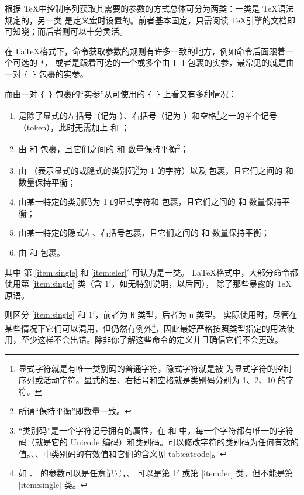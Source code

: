 \documentclass[openany]{book}
\begin{document}
根据 \TeX 中控制序列获取其需要的参数的方式总体可分为两类：一类是 \TeX 语法规定的，另一类
是定义宏时设置的。前者基本固定，只需阅读 \TeX 引擎的文档即可知晓；而后者则可以十分灵活。

在 \LaTeX 格式下，命令获取参数的规则有许多一致的地方，例如命令后面跟着一个可选的 \verb|*|，
或者是跟着可选的一个或多个由 \verb|[ ]| 包裹的实参，最常见的就是由一对 \verb|{ }| 包裹的实参。

而由一对 \verb|{ }| 包裹的“实参”从可使用的 \verb|{ }| 上看又有多种情况：
\begin{enumerate}
  \item\label{item:single} 是除了显式的左括号（记为 ）、右括号（记为 ）和空格\footnote{显式字符就是有唯一类别码的普通字符，隐式字符就是被  为显式字符的控制序列或活动字符。显式的左、右括号和空格就是类别码分别为 1、2、10 的字符。}之一的单个记号（token），此时无需加上  和 ；
  \item[1$'$.]\label{item:eler} 由  和  包裹，且它们之间的  和  数量保持平衡\footnote{所谓“保持平衡”即数量一致。}；
  \item\label{item:ler} 由 \BNFT{\{} （表示显式的或隐式的类别码\footnote{“类别码”是一个字符记号拥有的属性，在 \XeTeX 和 \LuaTeX 中，每一个字符都有唯一的字符码（就是它的 Unicode 编码）和类别码。可以修改字符的类别码为任何有效的值。\pdfTeX、\XeTeX、\LuaTeX 中类别码的有效值和它们的含义见\cref{tab:catcode}。}为 1 的字符）以及  包裹，且它们之间的  和  数量保持平衡；
  \item\label{item:sler} 由某一特定的类别码为 1 的显式字符和  包裹，且它们之间的  和  数量保持平衡；
  \item\label{item:silsir} 由某一特定的隐式左、右括号包裹，且它们之间的  和  数量保持平衡；
  \item\label{item:lr} 由 \BNFT{\{} 和 \BNFT{\}} 包裹。
\end{enumerate}
其中 第 \ref{item:single} 和 \ref{item:eler}$'$ 可认为是一类。
\LaTeX 格式中，大部分命令都使用第 \ref{item:single} 类（含 1$'$，如无特别说明，以后同），
除了那些暴露的 \TeX 原语。

\LaTeXiii 则区分 \ref{item:single} 和 1$'$，前者为 \texttt N 类型，后者为 \texttt n 类型。
实际使用时，尽管在某些情况下它们可以混用，但仍然有例外\footnote{如 、 的参数可以是任意记号，、 可以是第 1$'$ 或第 \ref{item:ler} 类，但不能是第 \ref{item:single} 类。}，因此最好严格按照类型指定的用法使用，至少这样不会出错。除非你了解这些命令的定义并且确信它们不会更改。
\end{document}

